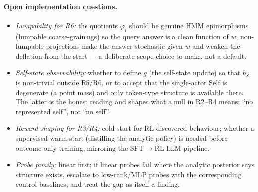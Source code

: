 \documentclass[11pt]{article}
\begin{document}
\paragraph{Open implementation questions.}
\begin{itemize}
  \item \emph{Lumpability for R6:} the quotients $\varphi_i$ should be genuine
  HMM epimorphisms (lumpable coarse-grainings) so the query answer is a clean
  function of $w$; non-lumpable projections make the answer stochastic given $w$
  and weaken the deflation from the start --- a deliberate scope choice to make,
  not a default.
  \item \emph{Self-state observability:} whether to define $g$ (the self-state
  update) so that $b_S$ is non-trivial outside R5/R6, or to accept that the
  single-actor Self is degenerate (a point mass) and only token-type structure
  is available there. The latter is the honest reading and shapes what a null in
  R2--R4 means: ``no represented self'', not ``no self''.
  \item \emph{Reward shaping for R3/R4:} cold-start for RL-discovered behaviour;
  whether a supervised warm-start (distilling the analytic policy) is needed
  before outcome-only training, mirroring the SFT$\to$RL LLM pipeline.
  \item \emph{Probe family:} linear first; if linear probes fail where the
  analytic posterior says structure exists, escalate to low-rank/MLP probes with
  the corresponding control baselines, and treat the gap as itself a finding.
\end{itemize}


\end{document}
